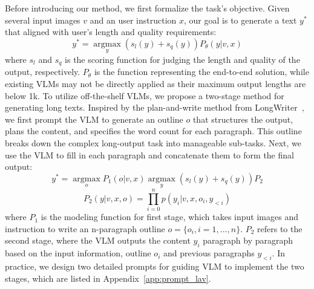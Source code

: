  Before introducing our method, we first formalize the task's objective. Given several input images $v$ and an user instruction $x$, our goal is to generate a text $y^*$ that aligned with user's length and quality requirements:
\begin{equation}
   y^* = \mathop{\arg\max}\limits_{y}(s_l(y) + s_q(y) )P_{\theta}(y|v,x) 
\end{equation}
where $s_l$ and $s_q$ is the scoring function for judging the length and quality of the output, respectively. $P_{\theta}$ is the function representing the end-to-end solution, while existing VLMs may not be directly applied as their maximum output lengths are below 1k.
To utilize off-the-shelf VLMs, we propose a two-stage method for generating long texts. Inspired by the plan-and-write method from LongWriter~\cite{bai2024longwriter}, we first prompt the VLM to generate an outline $o$ that structures the output, plans the content, and specifies the word count for each paragraph. This outline breaks down the complex long-output task into manageable sub-tasks. Next, we use the VLM to fill in each paragraph and concatenate them to form the final output:
\begin{equation}
y^* = \mathop{\arg\max}\limits_{o}P_{1}(o|v,x)  \mathop{\arg\max}\limits_{y}(s_l(y) + s_q(y) )P_{2}
\end{equation}
\begin{equation}
P_{2}(y|v,x,o) = \prod \limits_{i=0}^n p(y_i|v,x,o_i,y_{<i})
\end{equation}
where $P_{1}$ is the modeling function for first stage, which takes input images and instruction to write an n-paragraph outline $o = \{o_{i}, i =1,...,n\}$. $P_{2}$ refers to the second stage, where the VLM outputs the content $y_i$ paragraph by paragraph based on the input information, outline $o_{i}$ and previous paragraphs $y_{<i}$. In practice, we design two detailed prompts for guiding VLM to implement the two stages, which are listed in Appendix~\ref{app:prompt_lav}.



